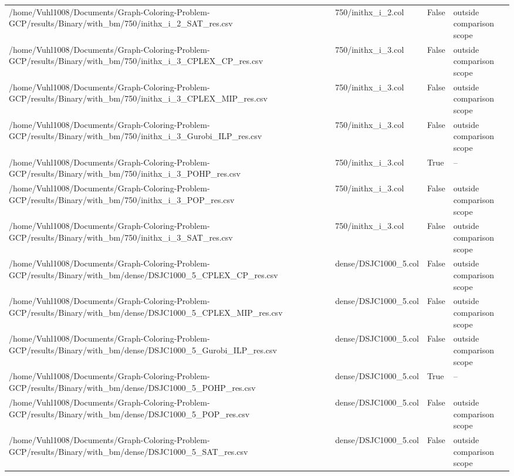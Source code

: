\begin{table}[htbp]
\begin{tabular}{llll}
/home/Vuhl1008/Documents/Graph-Coloring-Problem-GCP/results/Binary/with\_bm/750/inithx\_i\_2\_SAT\_res.csv & 750/inithx\_i\_2.col & False & outside comparison scope \\
/home/Vuhl1008/Documents/Graph-Coloring-Problem-GCP/results/Binary/with\_bm/750/inithx\_i\_3\_CPLEX\_CP\_res.csv & 750/inithx\_i\_3.col & False & outside comparison scope \\
/home/Vuhl1008/Documents/Graph-Coloring-Problem-GCP/results/Binary/with\_bm/750/inithx\_i\_3\_CPLEX\_MIP\_res.csv & 750/inithx\_i\_3.col & False & outside comparison scope \\
/home/Vuhl1008/Documents/Graph-Coloring-Problem-GCP/results/Binary/with\_bm/750/inithx\_i\_3\_Gurobi\_ILP\_res.csv & 750/inithx\_i\_3.col & False & outside comparison scope \\
/home/Vuhl1008/Documents/Graph-Coloring-Problem-GCP/results/Binary/with\_bm/750/inithx\_i\_3\_POHP\_res.csv & 750/inithx\_i\_3.col & True & -- \\
/home/Vuhl1008/Documents/Graph-Coloring-Problem-GCP/results/Binary/with\_bm/750/inithx\_i\_3\_POP\_res.csv & 750/inithx\_i\_3.col & False & outside comparison scope \\
/home/Vuhl1008/Documents/Graph-Coloring-Problem-GCP/results/Binary/with\_bm/750/inithx\_i\_3\_SAT\_res.csv & 750/inithx\_i\_3.col & False & outside comparison scope \\
/home/Vuhl1008/Documents/Graph-Coloring-Problem-GCP/results/Binary/with\_bm/dense/DSJC1000\_5\_CPLEX\_CP\_res.csv & dense/DSJC1000\_5.col & False & outside comparison scope \\
/home/Vuhl1008/Documents/Graph-Coloring-Problem-GCP/results/Binary/with\_bm/dense/DSJC1000\_5\_CPLEX\_MIP\_res.csv & dense/DSJC1000\_5.col & False & outside comparison scope \\
/home/Vuhl1008/Documents/Graph-Coloring-Problem-GCP/results/Binary/with\_bm/dense/DSJC1000\_5\_Gurobi\_ILP\_res.csv & dense/DSJC1000\_5.col & False & outside comparison scope \\
/home/Vuhl1008/Documents/Graph-Coloring-Problem-GCP/results/Binary/with\_bm/dense/DSJC1000\_5\_POHP\_res.csv & dense/DSJC1000\_5.col & True & -- \\
/home/Vuhl1008/Documents/Graph-Coloring-Problem-GCP/results/Binary/with\_bm/dense/DSJC1000\_5\_POP\_res.csv & dense/DSJC1000\_5.col & False & outside comparison scope \\
/home/Vuhl1008/Documents/Graph-Coloring-Problem-GCP/results/Binary/with\_bm/dense/DSJC1000\_5\_SAT\_res.csv & dense/DSJC1000\_5.col & False & outside comparison scope \\

\end{tabular}
\end{table}
